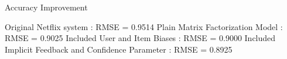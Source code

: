 \documentclass[10pt]{beamer}
\begin{document}
\begin{frame}{Accuracy Improvement}

Original Netflix system : \newline RMSE = 0.9514
\newline \newline
Plain Matrix Factorization Model : \newline RMSE = 0.9025
\newline \newline
Included User and Item Biases : \newline RMSE = 0.9000
\newline \newline
Included Implicit Feedback and Confidence Parameter : \newline RMSE = 0.8925

\end{frame}
\end{document}

